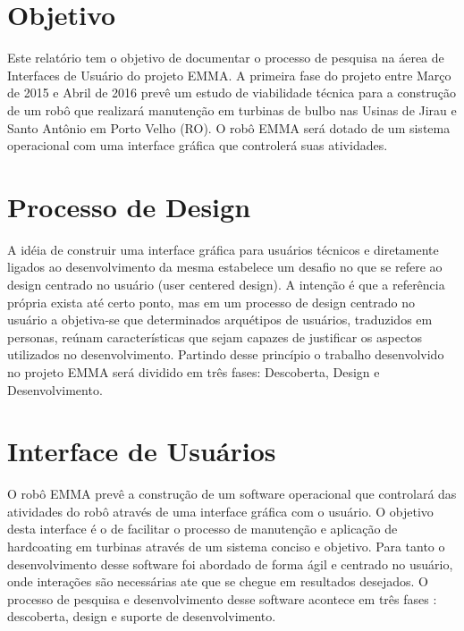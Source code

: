 \documentclass[12pt,a4paper]{article}
\begin{document}


\tableofcontents



\section{Objetivo}

Este relatório tem o objetivo de documentar o processo de pesquisa na áerea de
Interfaces de Usuário do projeto EMMA. A primeira fase do projeto entre Março de
2015 e Abril de 2016 prevê um estudo de viabilidade técnica para a construção de
um robô que realizará manutenção em turbinas de bulbo nas Usinas de Jirau e
Santo Antônio em Porto Velho (RO). O robô EMMA será dotado de um sistema
operacional com uma interface gráfica que controlerá suas atividades.

\section{Processo de Design}

A idéia de construir uma interface gráfica para usuários 
técnicos e diretamente ligados ao desenvolvimento da mesma estabelece um desafio
no que se refere ao design centrado no usuário (user centered design). A
intenção é que a referência própria exista até certo ponto, mas em um processo
de design centrado no usuário a objetiva-se que determinados arquétipos de
usuários, traduzidos em personas, reúnam características que sejam capazes de
justificar os aspectos utilizados no desenvolvimento. Partindo desse princípio o
trabalho desenvolvido no projeto EMMA será dividido em três fases: Descoberta, Design e Desenvolvimento.


 \section{Interface de Usuários}\label{sec::interface} 

O robô EMMA prevê a construção de um software operacional que 
controlará das atividades do robô através de uma interface gráfica com o
usuário.
O objetivo desta interface é o de facilitar o processo de manutenção e aplicação
de hardcoating em turbinas através de um sistema conciso e objetivo. Para tanto
o desenvolvimento desse software foi abordado de forma ágil e centrado no
usuário, onde interações são necessárias ate que se chegue em resultados
desejados.
O processo de pesquisa e desenvolvimento desse software acontece em três fases :
descoberta, design e suporte de desenvolvimento.
\end{document}
